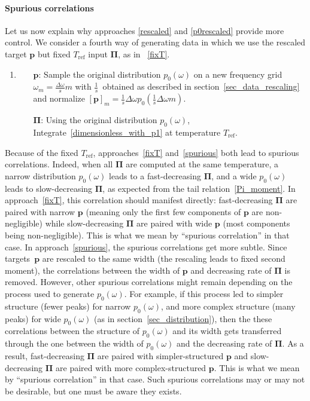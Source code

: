 \documentclass[notitlepage,11pt,nofootinbib]{revtex4-1}
\renewcommand{\vec}[1]{\bm{#1}}
\begin{document}
\paragraph*{Spurious correlations}
Let us now explain why approaches \ref{rescaled} and \ref{p0rescaled} provide more control. We consider a fourth way of generating data in which we use the rescaled target $\vec p$ but fixed $T_{\text{ref}}$ input $\vec \Pi$, as in ~\ref{fixT}.
\begin{enumerate}[resume]
    \item \label{spurious}
    \begin{itemize}
        \item[$\vec p$:] Sample the original distribution $p_0(\omega)$ on a new frequency grid $\omega_m=\frac{\Delta\omega}{s} m$ with $\frac{1}{s}$~obtained as described in section~\ref{sec_data_rescaling} and normalize $[\vec p]_m = \frac{1}{s}\Delta\omega p_0(\frac{1}{s}\Delta\omega m)$.

        \item[$\vec \Pi$:] Using the original distribution $p_0(\omega)$, Integrate~\eqref{dimensionless_with_p1} at temperature $T_{\text{ref}}$.
    \end{itemize}
\end{enumerate}
Because of the fixed $T_{\text{ref}}$, approaches~\ref{fixT} and~\ref{spurious} both lead to spurious correlations. Indeed, when all $\vec \Pi$ are computed at the same temperature, a narrow distribution $p_0(\omega)$ leads to a fast-decreasing $\vec \Pi$, and a wide $p_0(\omega)$ leads to slow-decreasing $\vec \Pi$, as expected from the tail relation~\eqref{Pi_moment}.
In approach~\ref{fixT}, this correlation should manifest directly: fast-decreasing $\vec \Pi$ are paired with narrow $\vec p$ (meaning only the first few components of $\vec p$ are non-negligible) while slow-decreasing $\vec \Pi$ are paired with wide $\vec p$ (most components being non-negligible). This is what we mean by ``spurious correlation'' in that case.
In approach~\ref{spurious}, the spurious correlations get more subtle. Since targets~$\vec p$ are rescaled to the same width (the rescaling leads to fixed second moment), the correlations between the width of $\vec p$ and decreasing rate of $\vec \Pi$ is removed. However, other spurious correlations might remain depending on the process used to generate $p_0(\omega)$. For example, if this process led to simpler structure (fewer peaks) for narrow $p_0(\omega)$, and more complex structure (many peaks) for wide $p_0(\omega)$ (as in section~\ref{sec_distribution}), then the these correlations between the structure of $p_0(\omega)$ and its width gets transferred through the one between the width of $p_0(\omega)$ and the decreasing rate of $\vec \Pi$. As a result, fast-decreasing $\vec \Pi$ are paired with simpler-structured $\vec p$ and slow-decreasing $\vec \Pi$ are paired with more complex-structured $\vec p$. This is what we mean by ``spurious correlation'' in that case.
Such spurious correlations may or may not be desirable, but one must be aware they exists.
\end{document}
